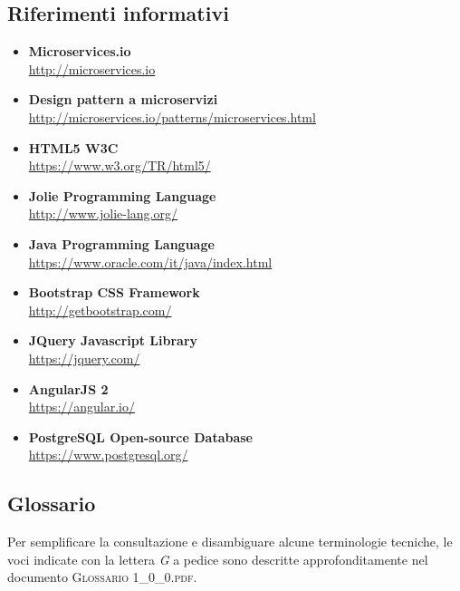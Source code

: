 \subsection{Riferimenti informativi}
\begin{itemize}
	\item \textbf{Microservices.io}\\
	\url{http://microservices.io}
	\item \textbf{Design pattern a microservizi}\\
	\url{http://microservices.io/patterns/microservices.html}
	\item \textbf{HTML5 W3C}\\
	\url{https://www.w3.org/TR/html5/}
	\item \textbf{Jolie Programming Language}\\
	\url{http://www.jolie-lang.org/}
	\item \textbf{Java Programming Language}\\
	\url{https://www.oracle.com/it/java/index.html}
	\item \textbf{Bootstrap CSS Framework}\\
	\url{http://getbootstrap.com/}
	\item \textbf{JQuery Javascript Library}\\
	\url{https://jquery.com/}
	\item \textbf{AngularJS 2}\\
	\url{https://angular.io/}
	\item \textbf{PostgreSQL Open-source Database}\\
	\url{https://www.postgresql.org/}
\end{itemize}

\subsection{Glossario}
Per semplificare la consultazione e disambiguare alcune terminologie tecniche, le voci indicate con la lettera \textit{G} a pedice sono descritte approfonditamente nel documento \textsc{Glossario 1\_0\_0.pdf}.